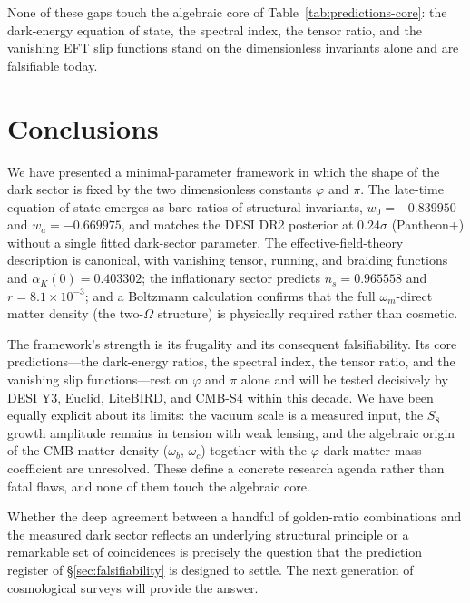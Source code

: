 \documentclass[a4paper,11pt]{article}
\begin{document}
None of these gaps touch the algebraic core of
Table~\ref{tab:predictions-core}: the dark-energy equation of state, the
spectral index, the tensor ratio, and the vanishing EFT slip functions stand on
the dimensionless invariants alone and are falsifiable today.

\section{Conclusions}
\label{sec:conclusions}

We have presented a minimal-parameter framework in which the shape of the dark
sector is fixed by the two dimensionless constants $\varphi$ and $\pi$. The
late-time equation of state emerges as bare ratios of structural invariants,
$w_0=-0.839950$ and $w_a=-0.669975$, and matches the DESI DR2 posterior at
$0.24\sigma$ (Pantheon+) without a single fitted dark-sector parameter. The
effective-field-theory description is canonical, with vanishing tensor, running,
and braiding functions and $\alpha_K(0)=0.403302$; the inflationary sector
predicts $n_s=0.965558$ and $r=8.1\times10^{-3}$; and a Boltzmann calculation
confirms that the full $\omega_m$-direct matter density (the two-$\Omega$
structure) is physically required rather than cosmetic.

The framework's strength is its frugality and its consequent falsifiability.
Its core predictions---the dark-energy ratios, the spectral index, the tensor
ratio, and the vanishing slip functions---rest on $\varphi$ and $\pi$ alone and
will be tested decisively by DESI Y3, Euclid, LiteBIRD, and CMB-S4 within this
decade. We have been equally explicit about its limits: the vacuum scale is a
measured input, the $S_8$ growth amplitude remains in tension with weak lensing,
and the algebraic origin of the CMB matter density ($\omega_b$, $\omega_c$)
together with the $\varphi$-dark-matter mass coefficient are unresolved. These
define a concrete research agenda rather than fatal flaws, and none of them
touch the algebraic core.

Whether the deep agreement between a handful of golden-ratio combinations and
the measured dark sector reflects an underlying structural principle or a
remarkable set of coincidences is precisely the question that the prediction
register of \S\ref{sec:falsifiability} is designed to settle. The next
generation of cosmological surveys will provide the answer.

\appendix
\end{document}
